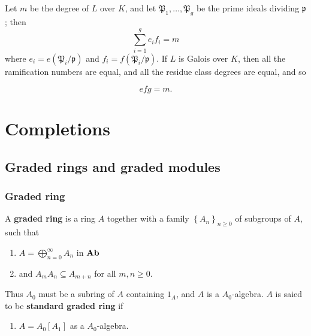 \begin{theorem}
    Let $m$ be the degree of $L$ over $K$, and let $\mathfrak{P}_1, \ldots, \mathfrak{P}_g$ be the prime ideals dividing $\mathfrak{p}$; then
    \begin{equation*}
        \sum_{i=1}^g e_i f_i=m
    \end{equation*}
    where $e_i=e\left(\mathfrak{P}_i / \mathfrak{p}\right)$ and $f_i=f\left(\mathfrak{P}_i / \mathfrak{p}\right)$. If $L$ is Galois over $K$, then all the ramification numbers are equal, and all the residue class degrees are equal, and so

    \begin{equation*}
        e f g=m .
    \end{equation*}
\end{theorem}























\chapter{Completions} %

\section{}








\section{Graded rings and graded modules}
\subsection{Graded ring}
\begin{definition}
    A \textbf{graded ring} is a ring $A$ together with a family $\left\{A_n\right\}_{n \geq 0}$ of subgroups of $A$, such that
    \begin{enumerate}[label=(\roman*)]
        \item
              $ A=\bigoplus_{n=0}^{\infty} A_n$ in $\mathbf{Ab}$
        \item
              and $A_m A_n \subseteq A_{m+n}$ for all $m, n \geq 0$.
    \end{enumerate}
    Thus $A_0$ must be a subring of $A$ containing $1_A$, and $A$ is a $A_0$-algebra.
    $A$ is saied to be \textbf{standard graded ring} if
    \begin{enumerate}[label=(\roman*), resume]
        \item $A=A_0[A_1]$ as a $A_0$-algebra.
    \end{enumerate}
\end{definition}

